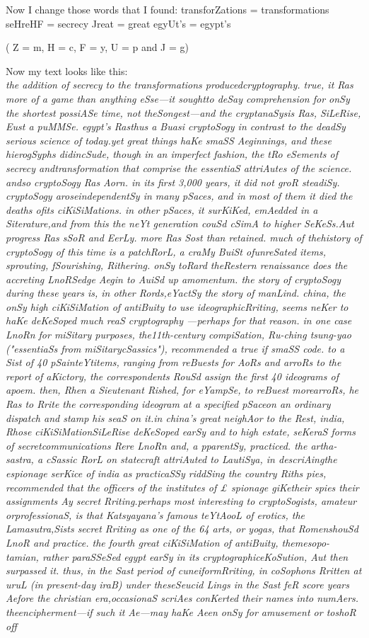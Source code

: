 \documentclass[12pt]{article}
\begin{document}
Now I change those words that I found: 
transforZations = transformations
seHreHF = secrecy
Jreat = great
egyUt's = egypt's

( Z = m, H = c, F = y, U = p and J = g)

Now my text looks like this:\\
\textit{the addition of secrecy to the transformations producedcryptography. true, it Ras more of a game than anything eSse—it soughtto deSay comprehension for onSy the shortest possiASe time, not theSongest—and the cryptanaSysis Ras, SiLeRise, Eust a puMMSe. egypt's Rasthus a Buasi cryptoSogy in contrast to the deadSy serious science of today.yet great things haKe smaSS Aeginnings, and these hierogSyphs didincSude, though in an imperfect fashion, the tRo eSements of secrecy andtransformation that comprise the essentiaS attriAutes of the science. andso cryptoSogy Ras Aorn. in its first 3,000 years, it did not groR steadiSy. cryptoSogy aroseindependentSy in many pSaces, and in most of them it died the deaths ofits ciKiSiMations. in other pSaces, it surKiKed, emAedded in a Siterature,and from this the neYt generation couSd cSimA to higher SeKeSs.Aut progress Ras sSoR and EerLy. more Ras Sost than retained. much of thehistory of cryptoSogy of this time is a patchRorL, a craMy BuiSt ofunreSated items, sprouting, fSourishing, Rithering. onSy toRard theRestern renaissance does the accreting LnoRSedge Aegin to AuiSd up amomentum. the story of cryptoSogy during these years is, in other Rords,eYactSy the story of manLind. china, the onSy high ciKiSiMation of antiBuity to use ideographicRriting, seems neKer to haKe deKeSoped much reaS cryptography —perhaps for that reason. in one case LnoRn for miSitary purposes, the11th-century compiSation, Ru-ching tsung-yao ("essentiaSs from miSitarycSassics"), recommended a true if smaSS code. to a Sist of 40 pSainteYtitems, ranging from reBuests for AoRs and arroRs to the report of aKictory, the correspondents RouSd assign the first 40 ideograms of apoem. then, Rhen a Sieutenant Rished, for eYampSe, to reBuest morearroRs, he Ras to Rrite the corresponding ideogram at a specified pSaceon an ordinary dispatch and stamp his seaS on it.in china's great neighAor to the Rest, india, Rhose ciKiSiMationSiLeRise deKeSoped earSy and to high estate, seKeraS forms of secretcommunications Rere LnoRn and, a pparentSy, practiced. the artha-sastra, a cSassic RorL on statecraft attriAuted to LautiSya, in descriAingthe espionage serKice of india as practicaSSy riddSing the country Riths pies, recommended that the officers of the institutes of £ spionage giKetheir spies their assignments Ay secret Rriting.perhaps most interesting to cryptoSogists, amateur orprofessionaS, is that Katsyayana's famous teYtAooL of erotics, the Lamasutra,Sists secret Rriting as one of the 64 arts, or yogas, that RomenshouSd LnoR and practice. the fourth great ciKiSiMation of antiBuity, themesopo-tamian, rather paraSSeSed egypt earSy in its cryptographiceKoSution, Aut then surpassed it. thus, in the Sast period of cuneiformRriting, in coSophons Rritten at uruL (in present-day iraB) under theseSeucid Lings in the Sast feR score years Aefore the christian era,occasionaS scriAes conKerted their names into numAers. theencipherment—if such it Ae—may haKe Aeen onSy for amusement or toshoR off
}
\end{document}
